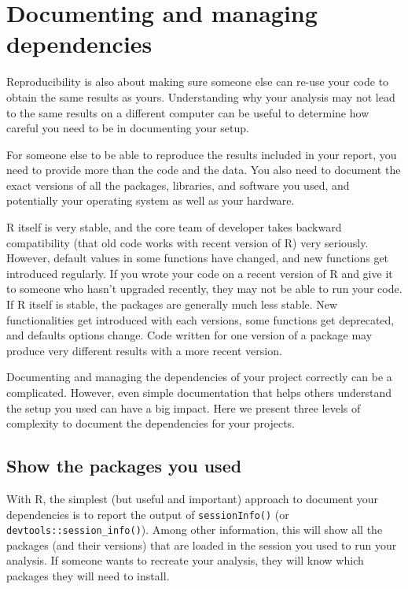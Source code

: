 \documentclass[
]{book}
\theoremstyle{definition}
\theoremstyle{definition}
\theoremstyle{definition}
\theoremstyle{definition}
\theoremstyle{remark}
\begin{document}
\hypertarget{documenting-and-managing-dependencies}{%
\chapter{Documenting and managing dependencies}\label{documenting-and-managing-dependencies}}

Reproducibility is also about making sure someone else can re-use your code to obtain the same results as yours. Understanding why your analysis may not lead to the same results on a different computer can be useful to determine how careful you need to be in documenting your setup.

For someone else to be able to reproduce the results included in your report, you need to provide more than the code and the data. You also need to document the exact versions of all the packages, libraries, and software you used, and potentially your operating system as well as your hardware.

R itself is very stable, and the core team of developer takes backward compatibility (that old code works with recent version of R) very seriously. However, default values in some functions have changed, and new functions get introduced regularly. If you wrote your code on a recent version of R and give it to someone who hasn't upgraded recently, they may not be able to run your code. If R itself is stable, the packages are generally much less stable. New functionalities get introduced with each versions, some functions get deprecated, and defaults options change. Code written for one version of a package may produce very different results with a more recent version.

Documenting and managing the dependencies of your project correctly can be a complicated. However, even simple documentation that helps others understand the setup you used can have a big impact. Here we present three levels of complexity to document the dependencies for your projects.

\hypertarget{show-the-packages-you-used}{%
\section{Show the packages you used}\label{show-the-packages-you-used}}

With R, the simplest (but useful and important) approach to document your dependencies is to report the output of \texttt{sessionInfo()} (or \texttt{devtools::session\_info()}). Among other information, this will show all the packages (and their versions) that are loaded in the session you used to run your analysis. If someone wants to recreate your analysis, they will know which packages they will need to install.
\end{document}

